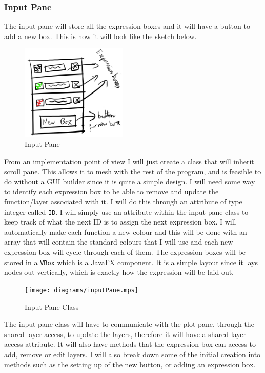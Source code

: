 \documentclass[../../../../main.tex]{subfiles}
\begin{document}
\subsubsection{Input Pane}
The input pane will store all the expression boxes and it will have a button to add a new box. This is how it will look like the sketch below.\\
\begin{figure}
	\centering
	\includegraphics[width=0.45\textwidth]{images/inputPane}
	\caption{Input Pane}
\end{figure}
From an implementation point of view I will just create a class that will inherit scroll pane. This allows it to mesh with the rest of the program, and is feasible to do without a GUI builder since it is quite a simple design. I will need some way to identify each expression box to be able to remove and update the function/layer associated with it. I will do this through an attribute of type integer called \texttt{ID}. I will simply use an attribute within the input pane class to keep track of what the next ID is to assign the next expression box. I will automatically make each function a new colour and this will be done with an array that will contain the standard colours that I will use and each new expression box will cycle through each of them. The expression boxes will be stored in a \texttt{VBox} which is a JavaFX component. It is a simple layout since it lays nodes out vertically, which is exactly how the expression will be laid out.\\
\begin{figure}[H]
	\centering
	\texttt{[image: diagrams/inputPane.mps]}
	\caption{Input Pane Class}
\end{figure}
The input pane class will have to communicate with the plot pane, through the shared layer access, to update the layers, therefore it will have a shared layer access attribute. It will also have methods that the expression box can access to add, remove or edit layers. I will also break down some of the initial creation into methods such as the setting up of the new button, or adding an expression box.
\newpage
\end{document}
